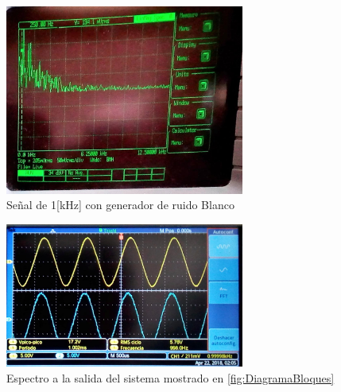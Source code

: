 \documentclass{article}
\begin{document}
  

   

\begin{figure}[h!]
    \centering
    \includegraphics[width=0.7\textwidth]{Imagenes/RuidoSenoEspectros.jpg}
    
    \caption{Señal de 1[kHz] con generador de ruido Blanco}
    \label{fig:ruidoSenoEspectros}
\end{figure}

\begin{figure}[h!]
    \centering
    \includegraphics[width=0.7\textwidth]{Imagenes/RuidoSenoFiltro.jpg}
   
    \caption{Espectro a la salida del sistema mostrado en \ref{fig:DiagramaBloques}}
    \label{fig:ruidoSenoFiltro}
\end{figure}
\end{document}
